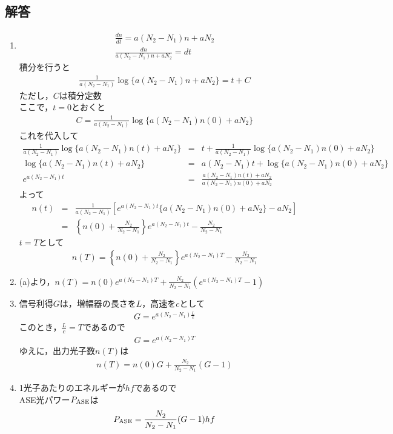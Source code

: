 \subsection*{解答}
\begin{enumerate}
    \renewcommand{\labelenumi}{(\alph{enumi})}
    \item
    \begin{eqnarray*}
        \frac{dn}{dt}=a(N_2-N_1)n+aN_2\\
        \frac{dn}{a(N_2-N_1)n+aN_2}=dt
    \end{eqnarray*}
    積分を行うと
    \begin{eqnarray*}
        \frac{1}{a(N_2-N_1)}\log{\{a(N_2-N_1)n+aN_2\}}=t+C
    \end{eqnarray*}
    ただし，$C$は積分定数\\
    ここで，$t=0$とおくと
    \begin{eqnarray*}
        C=\frac{1}{a(N_2-N_1)}\log{\{a(N_2-N_1)n(0)+aN_2\}}
    \end{eqnarray*}
    これを代入して
    \begin{eqnarray*}
        \frac{1}{a(N_2-N_1)}\log{\{a(N_2-N_1)n(t)+aN_2\}}&=&t+\frac{1}{a(N_2-N_1)}\log{\{a(N_2-N_1)n(0)+aN_2\}}\\
        \log{\{a(N_2-N_1)n(t)+aN_2\}}&=&a(N_2-N_1)t+\log{\{a(N_2-N_1)n(0)+aN_2\}}\\
        e^{a(N_2-N_1)t}&=&\frac{a(N_2-N_1)n(t)+aN_2}{a(N_2-N_1)n(0)+aN_2}
    \end{eqnarray*}
    よって
    \begin{eqnarray*}
        n(t)&=&\frac{1}{a(N_2-N_1)}\left[e^{a(N_2-N_1)t}\{a(N_2-N_1)n(0)+aN_2\}-aN_2\right]\\
        &=&\left\{n(0)+\frac{N_2}{N_2-N_1}\right\}e^{a(N_2-N_1)t}-\frac{N_2}{N_2-N_1}
    \end{eqnarray*}
    $t=T$として
    \begin{eqnarray*}
        n(T)=\left\{n(0)+\frac{N_2}{N_2-N_1}\right\}e^{a(N_2-N_1)T}-\frac{N_2}{N_2-N_1}
    \end{eqnarray*}
    \item
    (a)より，$n(T)=n(0)e^{a(N_2-N_1)T}+\frac{N_2}{N_2-N_1}\left(e^{a(N_2-N_1)T}-1\right)$
    \item
    信号利得$G$は，増幅器の長さを$L$，高速を$c$として
    \begin{eqnarray*}
        G=e^{a(N_2-N_1)\frac{L}{c}}
    \end{eqnarray*}
    このとき，$\frac{L}{c}=T$であるので
    \begin{eqnarray*}
        G=e^{a(N_2-N_1)T}
    \end{eqnarray*}
    ゆえに，出力光子数$n(T)$は
    \begin{eqnarray*}
        n(T)=n(0)G+\frac{N_2}{N_2-N_1}(G-1)
    \end{eqnarray*}
    \item
    1光子あたりのエネルギーが$hf$であるので\\
    ASE光パワー$P_{\rm ASE}$は
    \begin{eqnarray*}
        P_{\rm ASE}=\frac{N_2}{N_2-N_1}(G-1)hf
    \end{eqnarray*}
\end{enumerate}

